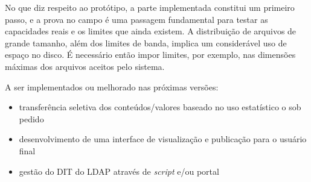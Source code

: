 No que diz respeito ao protótipo, a parte implementada constitui um
primeiro passo, e a prova no campo é uma passagem fundamental para
testar as capacidades reais e os limites que ainda existem. A
distribuição de arquivos de grande tamanho, além dos limites de banda,
implica um considerável uso de espaço no disco. É necessário então
impor limites, por exemplo, nas dimensões máximas dos arquivos aceitos
pelo sistema. 

A ser implementados ou melhorado nas próximas versões:

\begin{itemize}
\item transferência seletiva dos conteúdos/valores baseado no uso
  estatístico o sob pedido
\item desenvolvimento de uma interface de visualização e publicação
  para o usuário final
\item gestão do DIT do LDAP através de \emph{script} e/ou portal
\end{itemize}

